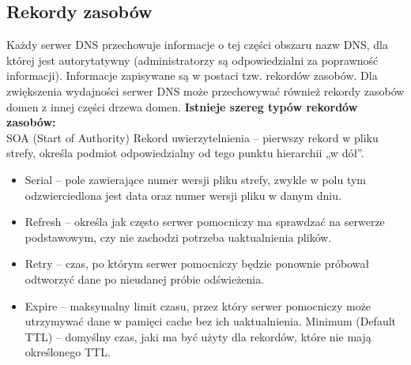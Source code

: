 \documentclass[../main.tex]{subfiles}
\begin{document}
        \subsection{Rekordy zasobów}
        Każdy serwer DNS przechowuje informacje o tej części obszaru nazw DNS, dla której jest
        autorytatywny (administratorzy są odpowiedzialni za poprawność informacji). Informacje
        zapisywane są w postaci tzw. rekordów zasobów.
        Dla zwiększenia wydajności serwer DNS może przechowywać również rekordy zasobów
        domen z innej części drzewa domen.
        \textbf{Istnieje szereg typów rekordów zasobów:}\\
        SOA (Start of Authority) Rekord uwierzytelnienia – pierwszy rekord w pliku
        strefy, określa podmiot odpowiedzialny od tego punktu hierarchii „w dół”.
        \begin{itemize}
            \item Serial – pole zawierające numer wersji pliku strefy, zwykle w polu tym odzwierciedlona jest
            data oraz numer wersji pliku w danym dniu.
            \item Refresh – określa jak często serwer pomocniczy ma sprawdzać na serwerze podstawowym,
            czy nie zachodzi potrzeba uaktualnienia plików.
            \item Retry – czas, po którym serwer pomocniczy będzie ponownie próbował odtworzyć dane po
            nieudanej próbie odświeżenia.
            \item Expire – maksymalny limit czasu, przez który serwer pomocniczy może utrzymywać dane w
            pamięci cache bez ich uaktualnienia.
            Minimum (Default TTL) – domyślny czas, jaki ma być użyty dla rekordów, które nie mają
            określonego TTL.
        \end{itemize}
\end{document}
